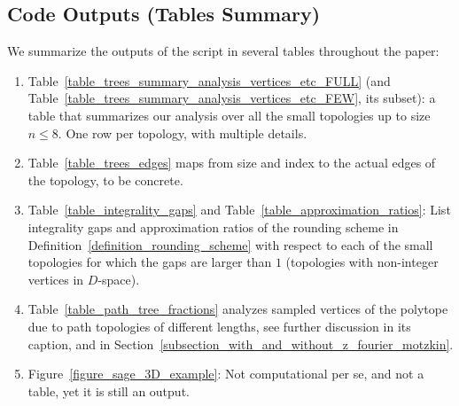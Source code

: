 \subsection{Code Outputs (Tables Summary)}
\label{subsection_outputs}
We summarize the outputs of the script in several tables throughout the paper:
\begin{enumerate}
    \item Table~\ref{table_trees_summary_analysis_vertices_etc_FULL} (and Table~\ref{table_trees_summary_analysis_vertices_etc_FEW}, its subset): a table that summarizes our analysis over all the small topologies up to size $n \le 8$. One row per topology, with multiple details.
    
    \item Table~\ref{table_trees_edges} maps from size and index to the actual edges of the topology, to be concrete.

    \item Table~\ref{table_integrality_gaps} and Table~\ref{table_approximation_ratios}: List integrality gaps and approximation ratios of the rounding scheme in Definition~\ref{definition_rounding_scheme} with respect to each of the small topologies for which the gaps are larger than $1$ (topologies with non-integer vertices in $D$-space).

    \item Table~\ref{table_path_tree_fractions} analyzes sampled vertices of the polytope due to path topologies of different lengths, see further discussion in its caption, and in Section~\ref{subsection_with_and_without_z_fourier_motzkin}.

    \item Figure~\ref{figure_sage_3D_example}: Not computational per se, and not a table, yet it is still an output.
\end{enumerate}


